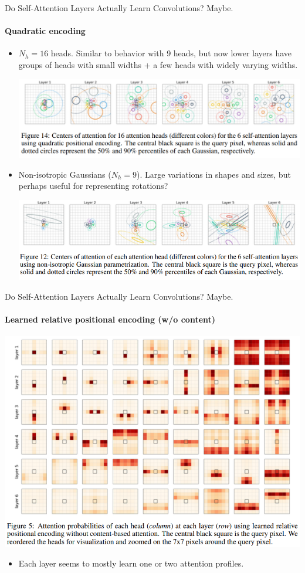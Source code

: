 \documentclass[9pt]{beamer}
\begin{document}
\begin{frame}{Do Self-Attention Layers Actually Learn Convolutions? Maybe.}
\framesubtitle{Quadratic encoding}
\begin{itemize}
\item $N_h=16$ heads. Similar to behavior with 9 heads, but now lower layers have groups of heads with small widths + a few heads with widely varying widths.
\begin{center}
    \includegraphics[width=.75\textwidth]{presentation/images/quad_emb_16.png}
\end{center}

\item Non-isotropic Gaussians ($N_h=9$). Large variations in shapes and sizes, but perhaps useful for representing rotations?
\begin{center}
    \includegraphics[width=.75\textwidth]{presentation/images/non_iso_gaussian.png}
\end{center}
\end{itemize}
\end{frame}


\begin{frame}{Do Self-Attention Layers Actually Learn Convolutions? Maybe.}
\framesubtitle{Learned relative positional encoding (w/o content)}
\begin{center}
    \includegraphics[width=.7\textwidth]{
        presentation/images/learned_rel_emb_nocontent.png}
    \vspace{-.1in}
\end{center}
\begin{itemize}
\item Each layer seems to mostly learn one or two attention profiles. 
\end{itemize}
\end{frame}
\end{document}
